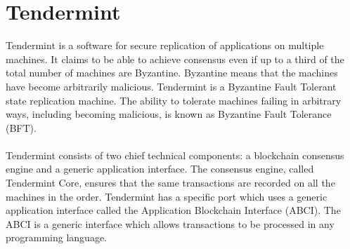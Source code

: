 \documentclass[a4paper,twoside,phd]{BYUPhys}
\begin{document}
\section{Tendermint}
Tendermint is a software for secure replication of applications on multiple machines\cite{TendermintTeam2018WhatDocumentation}. It claims to be able to achieve consensus even if up to a third of the total number of machines are Byzantine\cite{TendermintTeam2018WhatDocumentation}. Byzantine means that the machines have become arbitrarily malicious\cite{TendermintTeam2018WhatDocumentation}. Tendermint is a Byzantine Fault Tolerant state replication machine\cite{TendermintTeam2018WhatDocumentation}. The ability to tolerate machines failing in arbitrary ways, including becoming malicious, is known as Byzantine Fault Tolerance (BFT)\cite{TendermintTeam2018WhatDocumentation}.
\\
\\
Tendermint consists of two chief technical components: a blockchain consensus engine and a generic application interface\cite{TendermintTeam2018WhatDocumentation}. The consensus engine, called Tendermint Core, ensures that the same transactions are recorded on all the machines in the order\cite{TendermintTeam2018WhatDocumentation}. Tendermint has a specific port which uses a generic application interface called the Application Blockchain Interface (ABCI)\cite{TendermintTeam2018WhatDocumentation}. The ABCI is a generic interface which allows transactions to be processed in any programming language\cite{TendermintTeam2018WhatDocumentation}. 
\end{document}
